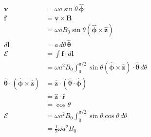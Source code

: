 \documentclass{article}
\renewcommand{\vec}[1]{\boldsymbol{\mathbf{#1}}}
\newcommand{\uvec}[1]{\hat{\vec{#1}}}
\begin{document}
\setcounter{subsection}{46}
\subsection{}

\begin{align*}
  \vec{v}                                           & = \omega a \sin \theta \,\uvec{\phi}                                                                       \\
  \vec{f}                                           & = \vec{v} \times \vec{B}                                                                                   \\
                                                    & = \omega a B_0 \sin \theta (\uvec{\phi} \times \uvec{z})                                                   \\
  d \vec{l}                                         & = a \,d \theta \,\uvec{\theta}                                                                             \\
  \mathcal{E}                                       & = \int \vec{f} \cdot d \vec{l}                                                                             \\
                                                    & = \omega a^2 B_0 \int_0^{\pi / 2} \sin \theta (\uvec{\phi} \times \uvec{z}) \cdot \uvec{\theta} \,d \theta \\
  \uvec{\theta} \cdot (\uvec{\phi} \times \uvec{z}) & = \uvec{z} \cdot (\uvec{\theta} \cdot \uvec{\phi})                                                         \\
                                                    & = \uvec{z} \cdot \uvec{r}                                                                                  \\
                                                    & = \cos \theta                                                                                              \\
  \mathcal{E}                                       & = \omega a^2 B_0 \int_0^{\pi / 2} \sin \theta \cos \theta \,d \theta                                       \\
                                                    & = \frac{1}{2} \omega a^2 B_0
\end{align*}

\setcounter{subsection}{48}
\subsection{}
\end{document}
